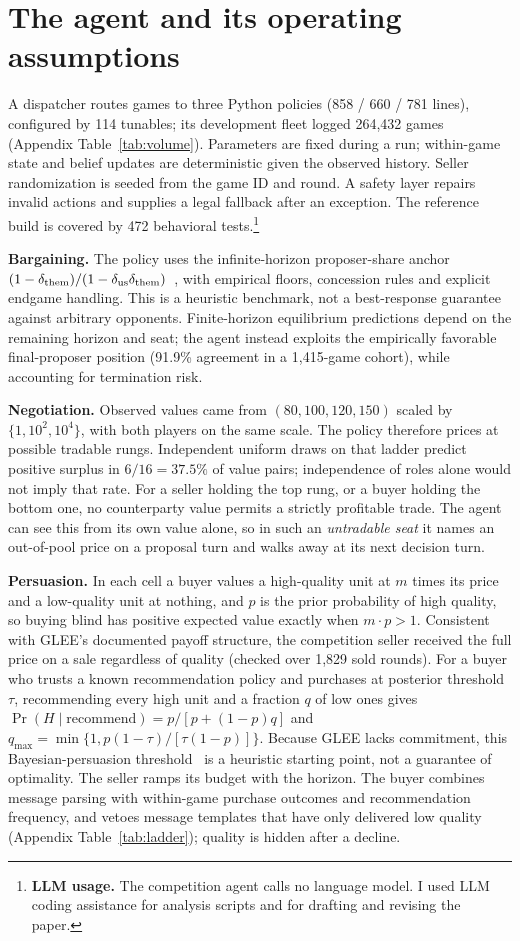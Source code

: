 \documentclass{article}
\begin{document}
\section{The agent and its operating assumptions}
A dispatcher routes games to three Python policies (858 / 660 / 781 lines),
configured by 114 tunables; its development fleet logged 264,432 games
(Appendix Table~\ref{tab:volume}). Parameters are fixed during a
run; within-game state
and belief updates are deterministic given the observed history. Seller
randomization is seeded from the game ID and round. A safety layer repairs
invalid actions and supplies a legal fallback after an exception. The reference
build is covered by 472 behavioral tests.\footnote{\textbf{LLM usage.} The competition
agent calls no language model. I used LLM coding assistance for analysis scripts
and for drafting and revising the paper.}

\textbf{Bargaining.} The policy uses the infinite-horizon proposer-share anchor
$(1-\delta_{\rm them})/(1-\delta_{\rm us}\delta_{\rm them})$~\cite{rubinstein1982},
with empirical floors, concession rules and explicit endgame handling. This is a
heuristic benchmark, not a best-response guarantee against arbitrary opponents.
Finite-horizon equilibrium predictions depend on the remaining horizon and seat;
the agent instead exploits the empirically favorable final-proposer position
(91.9\% agreement in a 1,415-game cohort), while accounting for termination risk.

\textbf{Negotiation.} Observed values came from $(80,100,120,150)$ scaled by
$\{1,10^2,10^4\}$, with both players on the same scale. The policy therefore
prices at possible tradable rungs. Independent uniform draws on that ladder
predict positive surplus in $6/16=37.5\%$ of value pairs; independence of roles
alone would not imply that rate. For a seller holding the top rung, or a buyer holding
the bottom one, no counterparty value permits a strictly profitable trade. The
agent can see this from its own value alone, so in such an \emph{untradable seat} it names an out-of-pool price
on a proposal turn and walks away at its next decision turn.

\textbf{Persuasion.} In each cell a buyer values a high-quality unit at $m$ times
its price and a low-quality unit at nothing, and $p$ is the prior probability of
high quality, so buying blind has positive expected value exactly when $m\cdot p>1$.
Consistent with GLEE's documented payoff structure, the
competition seller received the full price on a sale regardless of quality
(checked over 1,829 sold rounds). For a buyer who trusts a known recommendation
policy and purchases at posterior threshold $\tau$, recommending every high unit
and a fraction $q$ of low ones gives
$\Pr(H\mid\mathrm{recommend})=p/[p+(1-p)q]$ and
$q_{\max}=\min\{1,p(1-\tau)/[\tau(1-p)]\}$.
Because GLEE lacks commitment, this Bayesian-persuasion threshold~\cite{kamenica2011bayesian}
is a heuristic starting point, not a guarantee of optimality. The seller ramps its
budget with the horizon. The buyer combines message parsing with within-game
purchase outcomes and recommendation frequency, and vetoes message templates that
have only delivered low quality (Appendix Table~\ref{tab:ladder}); quality is
hidden after a decline.
\end{document}
